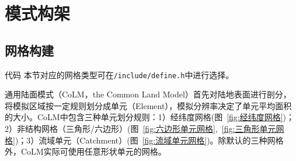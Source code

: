 \chapter{模式构架}\label{模式构架}
\section{网格构建}\label{网格构建}
\begin{mymdframed}{代码}
本节对应的网格类型可在\texttt{/include/define.h}中进行选择。
\end{mymdframed}

通用陆面模式（CoLM，the Common Land Model）首先对陆地表面进行剖分，将模拟区域按一定规则划分成单元（Element），模拟分辨率决定了单元平均面积的大小。CoLM中包含三种单元划分规则：1）经纬度网格(图~\ref{fig:经纬度网格})；2）非结构网格（三角形/六边形）(图~\ref{fig:六边形单元网格},~\ref{fig:三角形单元网格})；3）流域单元（Catchment）(图~\ref{fig:流域单元网格})。除默认的三种网格外，CoLM实际可使用任意形状单元的网格。

